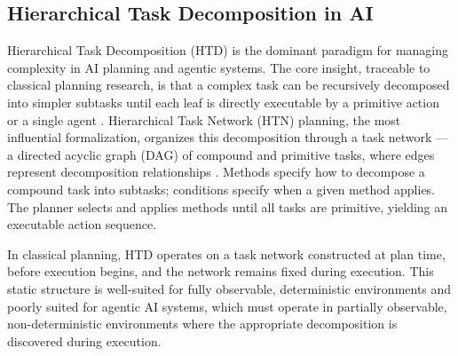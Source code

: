\subsection{Hierarchical Task Decomposition in AI}

Hierarchical Task Decomposition (HTD) is the dominant paradigm for managing complexity in AI planning and agentic systems. The core insight, traceable to classical planning research, is that a complex task can be recursively decomposed into simpler subtasks until each leaf is directly executable by a primitive action or a single agent \cite{nilsson1982principles}. Hierarchical Task Network (HTN) planning, the most influential formalization, organizes this decomposition through a task network --- a directed acyclic graph (DAG) of compound and primitive tasks, where edges represent decomposition relationships \cite{ghallab2004htn}. Methods specify how to decompose a compound task into subtasks; conditions specify when a given method applies. The planner selects and applies methods until all tasks are primitive, yielding an executable action sequence.

In classical planning, HTD operates on a task network constructed at plan time, before execution begins, and the network remains fixed during execution. This static structure is well-suited for fully observable, deterministic environments and poorly suited for agentic AI systems, which must operate in partially observable, non-deterministic environments where the appropriate decomposition is discovered during execution.

